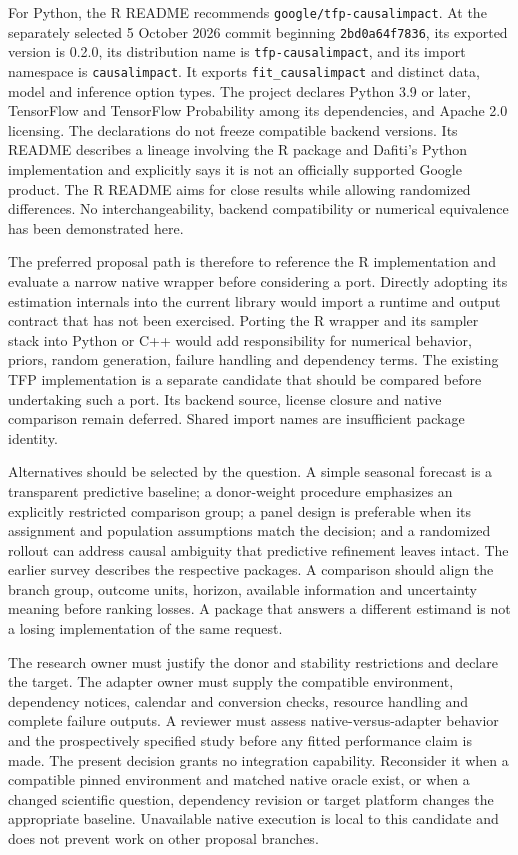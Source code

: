 For Python, the R README recommends \texttt{google/tfp-causalimpact}.
At the separately selected 5 October 2026 commit beginning
\texttt{2bd0a64f7836}, its exported version is 0.2.0, its distribution name
is \texttt{tfp-causalimpact}, and its import namespace is
\texttt{causalimpact}. It exports \texttt{fit\_causalimpact} and distinct
data, model and inference option types. The project declares Python 3.9 or
later, TensorFlow and TensorFlow Probability among its dependencies, and
Apache 2.0 licensing. The declarations do not freeze compatible backend
versions. Its README describes a lineage involving the R package and Dafiti's
Python implementation and explicitly says it is not an officially supported
Google product. The R README aims for close results while allowing
randomized differences. No interchangeability, backend compatibility or
numerical equivalence has been demonstrated here.
\cite{exec13_ci_python,exec13_ci_r}

The preferred proposal path is therefore to reference the R implementation
and evaluate a narrow native wrapper before considering a port. Directly
adopting its estimation internals into the current library would import a
runtime and output contract that has not been exercised. Porting the R
wrapper and its sampler stack into Python or C++ would add responsibility
for numerical behavior, priors, random generation, failure handling and
dependency terms. The existing TFP implementation is a separate candidate
that should be compared before undertaking such a port. Its backend source,
license closure and native comparison remain deferred. Shared import names
are insufficient package identity. \cite{exec13_ci_reuse,exec13_ci_python}

Alternatives should be selected by the question. A simple seasonal forecast
is a transparent predictive baseline; a donor-weight procedure emphasizes
an explicitly restricted comparison group; a panel design is preferable
when its assignment and population assumptions match the decision; and a
randomized rollout can address causal ambiguity that predictive refinement
leaves intact. The earlier survey describes the respective packages. A
comparison should align the branch group, outcome units, horizon, available
information and uncertainty meaning before ranking losses. A package that
answers a different estimand is not a losing implementation of the same
request.

The research owner must justify the donor and stability restrictions and
declare the target. The adapter owner must supply the compatible environment,
dependency notices, calendar and conversion checks, resource handling and
complete failure outputs. A reviewer must assess native-versus-adapter
behavior and the prospectively specified study before any fitted performance
claim is made. The present decision grants no integration capability.
Reconsider it when a compatible pinned environment and matched native oracle
exist, or when a changed scientific question, dependency revision or target
platform changes the appropriate baseline. Unavailable native execution is
local to this candidate and does not prevent work on other proposal branches.
\cite{exec13_ci_reuse}
\label{exec13:causalimpact-reuse-end}


